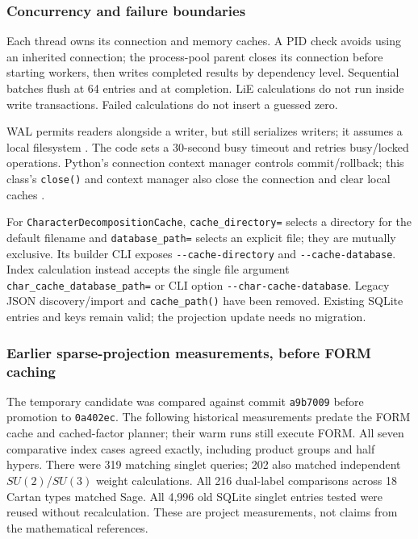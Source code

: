 \documentclass[11pt,a4paper]{article}
\numberwithin{equation}{section}
\newcommand{\code}[1]{{\small\nolinkurl{#1}}}
\begin{document}
\subsubsection{Concurrency and failure boundaries}
Each thread owns its connection and memory caches. A PID check avoids using an
inherited connection; the process-pool parent closes its connection before
starting workers, then writes completed results by dependency level. Sequential
batches flush at 64 entries and at completion. LiE calculations do not run inside
write transactions. Failed calculations do not insert a guessed zero.

WAL permits readers alongside a writer, but still serializes writers; it assumes
a local filesystem \cite{sqlite-wal}. The code sets a 30-second busy timeout and
retries busy/locked operations. Python's connection context manager controls
commit/rollback; this class's \code{close()} and context manager also close the
connection and clear local caches \cite{python-sqlite}.

For \code{CharacterDecompositionCache}, \code{cache_directory=} selects a directory
for the default filename and \code{database_path=} selects an explicit file;
they are mutually exclusive. Its builder CLI exposes \code{--cache-directory}
and \code{--cache-database}. Index calculation instead accepts the single file
argument \code{char_cache_database_path=} or CLI option \code{--char-cache-database}.
Legacy JSON discovery/import and \code{cache_path()} have been removed. Existing
SQLite entries and keys remain valid; the projection update needs no migration.

\newcommand{\cacheheading}{\subsubsection}


\clearpage
\subsubsection{Earlier sparse-projection measurements, before FORM caching}
The temporary candidate was compared against commit \code{a9b7009} before
promotion to \code{0a402ec}. The following historical measurements predate the
FORM cache and cached-factor planner; their warm runs still execute FORM.
All seven comparative index cases agreed exactly, including product groups and
half hypers. There were 319 matching singlet queries; 202 also matched independent
$SU(2)$/$SU(3)$ weight calculations. All 216 dual-label comparisons across 18
Cartan types matched Sage. All 4,996 old SQLite singlet entries tested were reused
without recalculation. These are project measurements, not claims from the
mathematical references.
\end{document}
